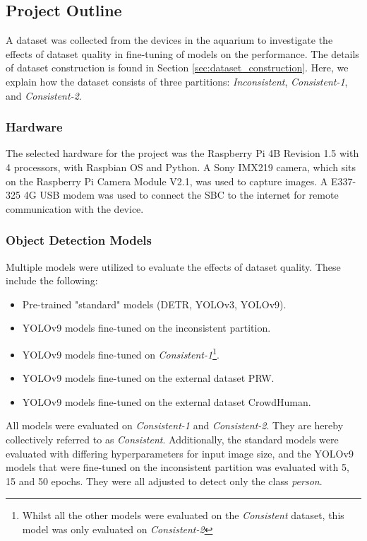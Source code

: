 \subsection{Project Outline}
\label{sec:project}
A dataset was collected from the devices in the aquarium to investigate the effects of dataset quality in fine-tuning of models on the performance. The details of dataset construction is found in Section \ref{sec:dataset_construction}. Here, we explain how the dataset consists of three partitions: \textit{Inconsistent}, \textit{Consistent-1}, and \textit{Consistent-2}. 

\subsubsection{Hardware}
The selected hardware for the project was the Raspberry Pi 4B Revision 1.5 with 4 processors, with Raspbian OS and Python. A Sony IMX219 camera, which sits on the Raspberry Pi Camera Module V2.1, was used to capture images. A E337-325 4G USB modem was used to connect the SBC to the internet for remote communication with the device. 

\subsubsection{Object Detection Models}
Multiple models were utilized to evaluate the effects of dataset quality. These include the following:
\begin{itemize}
    \item Pre-trained "standard" models (DETR, YOLOv3, YOLOv9).
    \item YOLOv9 models fine-tuned on the inconsistent partition.
    \item YOLOv9 models fine-tuned on \textit{Consistent-1}\footnote{Whilst all the other models were evaluated on the \textit{Consistent} dataset, this model was only evaluated on \textit{Consistent-2}}.
    \item YOLOv9 models fine-tuned on the external dataset PRW.
    \item YOLOv9 models fine-tuned on the external dataset CrowdHuman.
\end{itemize}

All models were evaluated on \textit{Consistent-1} and \textit{Consistent-2}. They are hereby collectively referred to as \textit{Consistent}. Additionally, the standard models were evaluated with differing hyperparameters for input image size, and the YOLOv9 models that were fine-tuned on the inconsistent partition was evaluated with 5, 15 and 50 epochs. They were all adjusted to detect only the class \textit{person}.

